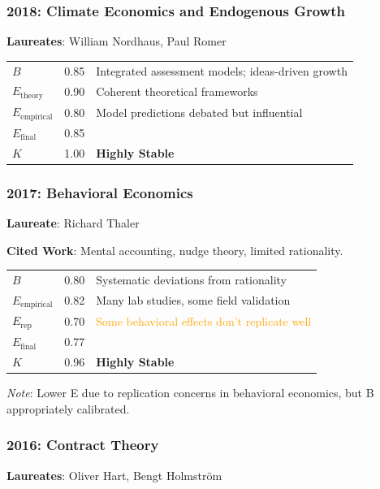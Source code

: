 \documentclass[11pt,a4paper]{article}
\begin{document}
\subsubsection{2018: Climate Economics and Endogenous Growth}
\textbf{Laureates}: William Nordhaus, Paul Romer

\begin{center}
\begin{tabular}{lcl}
\toprule
$B$ & 0.85 & Integrated assessment models; ideas-driven growth \\
$E_{\text{theory}}$ & 0.90 & Coherent theoretical frameworks \\
$E_{\text{empirical}}$ & 0.80 & Model predictions debated but influential \\
\midrule
$E_{\text{final}}$ & 0.85 & \\
$K$ & 1.00 & \textbf{Highly Stable} \\
\bottomrule
\end{tabular}
\end{center}

\subsubsection{2017: Behavioral Economics}
\textbf{Laureate}: Richard Thaler

\textbf{Cited Work}: Mental accounting, nudge theory, limited rationality.

\begin{center}
\begin{tabular}{lcl}
\toprule
$B$ & 0.80 & Systematic deviations from rationality \\
$E_{\text{empirical}}$ & 0.82 & Many lab studies, some field validation \\
$E_{\text{rep}}$ & 0.70 & \textcolor{orange}{Some behavioral effects don't replicate well} \\
\midrule
$E_{\text{final}}$ & 0.77 & \\
$K$ & 0.96 & \textbf{Highly Stable} \\
\bottomrule
\end{tabular}
\end{center}

\textit{Note}: Lower E due to replication concerns in behavioral economics, but B appropriately calibrated.

\subsubsection{2016: Contract Theory}
\textbf{Laureates}: Oliver Hart, Bengt Holmström
\end{document}
